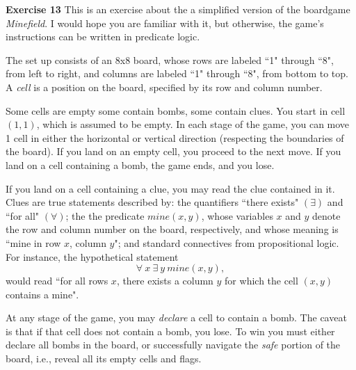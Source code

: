 \documentclass[12pt,oneside]{exam}
\newenvironment{exercise}[1]{\vspace{.1in}\noindent\textbf{Exercise #1 \hspace{.05em}}}{}
\begin{document}
\begin{exercise}{13}
This is an exercise about the a simplified version of the boardgame \textit{Minefield}. I would hope you are familiar with it, but otherwise, the game's instructions can be written in predicate logic. 

The set up consists of an 8x8 board, whose rows are labeled ``1" through ``8", from left to right, and columns are labeled ``1" through ``8", from bottom to top. A \textit{cell} is a position on the board, specified by its row and column number. 

Some cells are empty some contain bombs, some contain clues. You start in cell $(1,1)$, which is assumed to be empty. In each stage of the game, you can move 1 cell in either the horizontal or vertical direction (respecting the boundaries of the board). If you land on an empty cell, you proceed to the next move. If you land on a cell containing a bomb, the game ends, and you lose. 

If you land on a cell containing a clue, you may read the clue contained in it. Clues are true statements described by: the quantifiers ``there exists" $(\exists)$ and ``for all" $(\forall)$; the the predicate $mine(x,y)$, whose variables $x$ and $y$ denote the row and column number on the board, respectively, and whose meaning is ``mine in row $x$, column $y$"; and standard connectives from propositional logic. For instance, the hypothetical statement 
\begin{equation*}
\forall \ x \ \exists \ y \ mine(x,y),
\end{equation*}
would read ``for all rows $x$, there exists a column $y$ for which the cell $(x,y)$ contains a mine". 

At any stage of the game, you may \textit{declare} a cell to contain a bomb. The caveat is that if that cell does not contain a bomb, you lose. To win you must either declare all bombs in the board, or successfully navigate the \textit{safe} portion of the board, i.e., reveal all its empty cells and flags. 


\end{exercise}
\end{document}
